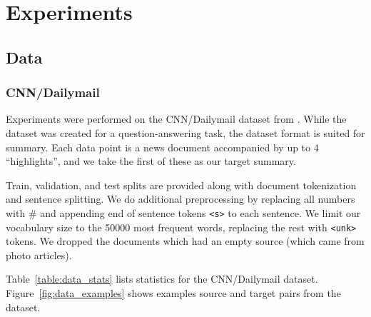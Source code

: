 \documentclass[12pt]{report}
\begin{document}
%
%

%


\chapter{Experiments}
\label{chap:experiments}

\section{Data}

\subsection{CNN/Dailymail}

Experiments were performed on the CNN/Dailymail dataset from \cite{Hermann2015}.
While the dataset was created for a question-answering task, the dataset format is suited for summary. Each data point is a news document accompanied by up to 4 ``highlights'', and we take the first of these as our target summary.



Train, validation, and test splits are provided along with document tokenization and sentence splitting. We do additional preprocessing by replacing all numbers with \# and appending end of sentence tokens \texttt{<s>} to each sentence. We limit our vocabulary size to the 50000 most frequent words, replacing the rest with \texttt{<unk>} tokens. We dropped the documents which had an empty source (which came from photo articles).

 Table~\ref{table:data_stats} lists statistics for the CNN/Dailymail dataset. Figure~\ref{fig:data_examples} shows examples source and target pairs from the dataset.
\end{document}
